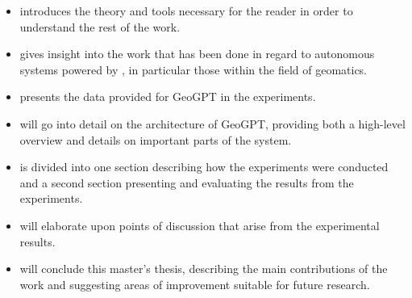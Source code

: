 \begin{itemize}
    \item {} introduces the theory and tools necessary for the reader in order to understand the rest of the work.
    \item {} gives insight into the work that has been done in regard to autonomous systems powered by , in particular those within the field of geomatics.
    \item {} presents the data provided for GeoGPT in the experiments.
    \item {} will go into detail on the architecture of GeoGPT, providing both a high-level overview and details on important parts of the system.
    \item {} is divided into one section describing how the experiments were conducted and a second section presenting and evaluating the results from the experiments.
    \item {} will elaborate upon points of discussion that arise from the experimental results.
    \item {} will conclude this master's thesis, describing the main contributions of the work and suggesting areas of improvement suitable for future research.
\end{itemize}


\glsresetall